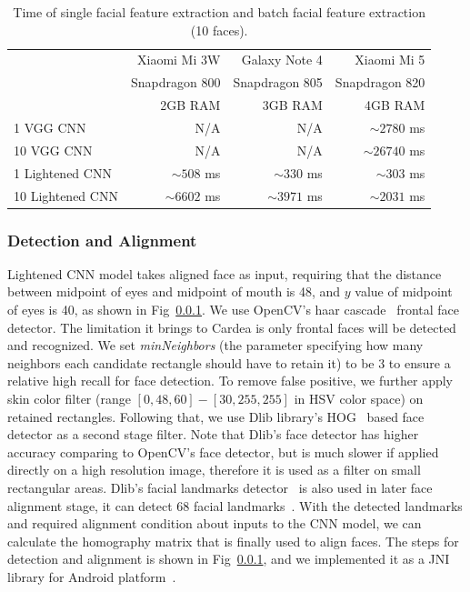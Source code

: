 \begin{table}[tb]
\centering
\caption{Time of single facial feature extraction and batch facial feature extraction (10 faces).}
\label{tbl-forwardingtime}
\begin{tabular}{lrrr}
\toprule
 & Xiaomi Mi 3W & Galaxy Note 4 & Xiaomi Mi 5\\
 & {\small Snapdragon 800} & {\small Snapdragon 805} & {\small Snapdragon 820}\\
 & {\small 2GB RAM} & {\small 3GB RAM} & {\small 4GB RAM}\\
 \midrule
1 VGG CNN & N/A & N/A & $\sim 2780$ ms \\
10 VGG CNN & N/A & N/A & $\sim 26740$ ms \\
1 Lightened CNN & $\sim 508$ ms & $\sim 330$ ms & $\sim 303$ ms \\
10 Lightened CNN & $\sim 6602$ ms & $\sim 3971$ ms & $\sim 2031$ ms \\
 \bottomrule

\end{tabular}
\end{table}


\subsubsection{Detection and Alignment}
Lightened CNN model takes aligned face as input, requiring that the distance between midpoint of eyes and midpoint of mouth is 48, and $y$ value of midpoint of eyes is 40, as shown in Fig~\ref{}. We use OpenCV's haar cascade~\cite{links:opencv,viola2001rapid} frontal face detector. The limitation it brings to Cardea is only frontal faces will be detected and recognized. We set \emph{minNeighbors} (the parameter specifying how many neighbors each candidate rectangle should have to retain it) to be 3 to ensure a relative high recall for face detection. To remove false positive, we further apply skin color filter (range $[0, 48, 60] - [30, 255, 255]$ in HSV color space) on retained rectangles. Following that, we use Dlib library's HOG~\cite{links:dlib,dalal2005histograms} based face detector as a second stage filter. Note that Dlib's face detector has higher accuracy comparing to OpenCV's face detector, but is much slower if applied directly on a high resolution image, therefore it is used as a filter on small rectangular areas. Dlib's facial landmarks detector~\cite{links:dlibfacepose} is also used in later face alignment stage, it can detect 68 facial landmarks~\cite{links:dlibfacelandmarkspos, links:dlibfacelandmarkscoords}. With the detected landmarks and required alignment condition about inputs to the CNN model, we can calculate the homography matrix that is finally used to align faces. The steps for detection and alignment is shown in Fig~\ref{}, and we implemented it as a JNI library for Android platform~\cite{links:facealignjni}.

